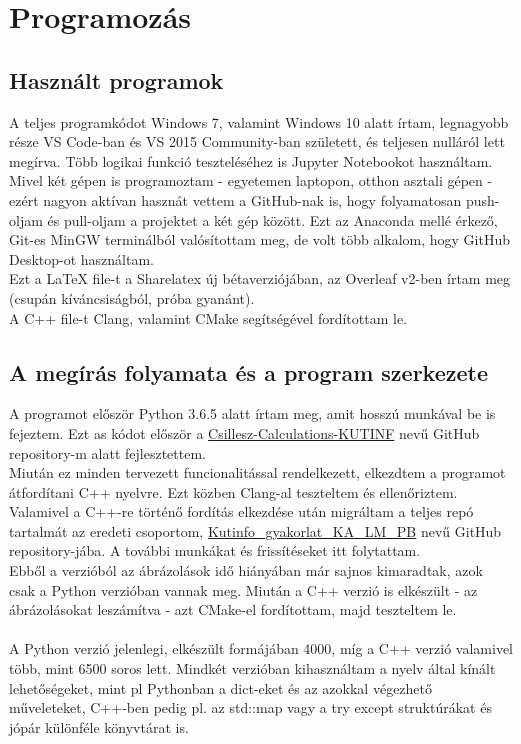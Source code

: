 \chapter{Programozás}

\label{ch:programozas}

\section{Használt programok}

A teljes programkódot Windows 7, valamint Windows 10 alatt írtam, legnagyobb része VS Code-ban és VS 2015 Community-ban született, és teljesen nulláról lett megírva. Több logikai funkció teszteléséhez is Jupyter Notebookot használtam. Mivel két gépen is programoztam - egyetemen laptopon, otthon asztali gépen - ezért nagyon aktívan hasznát vettem a GitHub-nak is, hogy folyamatosan push-oljam és pull-oljam a projektet a két gép között. Ezt az Anaconda mellé érkező, Git-es MinGW terminálból valósítottam meg, de volt több alkalom, hogy GitHub Desktop-ot használtam.\\
Ezt a LaTeX file-t a Sharelatex új bétaverziójában, az Overleaf v2-ben írtam meg (csupán kíváncsiságból, próba gyanánt).\\
A C++ file-t Clang, valamint CMake segítségével fordítottam le.

\section{A megírás folyamata és a program szerkezete}

A programot először Python 3.6.5 alatt írtam meg, amit hosszú munkával be is fejeztem. Ezt as kódot először a \href{https://github.com/masterdesky/Csillesz-Calculations-KUTINF}{Csillesz-Calculations-KUTINF} nevű GitHub repository-m alatt fejlesztettem.\\
Miután ez minden tervezett funcionalitással rendelkezett, elkezdtem a programot átfordítani C++ nyelvre. Ezt közben Clang-al teszteltem és ellenőriztem. \\ 
Valamivel a C++-re történő fordítás elkezdése után migráltam a teljes repó tartalmát az eredeti csoportom, \href{https://github.com/masterdesky/Kutinfo_gyakorlat_KA_LM_PB}{Kutinfo\_gyakorlat\_KA\_LM\_PB} nevű GitHub repository-jába. A további munkákat és frissítéseket itt folytattam.\\
Ebből a verzióból az ábrázolások idő hiányában már sajnos kimaradtak, azok csak a Python verzióban vannak meg. Miután a C++ verzió is elkészült - az ábrázolásokat leszámítva - azt CMake-el fordítottam, majd teszteltem le.\\ \\
A Python verzió jelenlegi, elkészült formájában 4000, míg a C++ verzió valamivel több, mint 6500 soros lett. Mindkét verzióban kihasználtam a nyelv által kínált lehetőségeket, mint pl Pythonban a dict-eket és az azokkal végezhető műveleteket, C++-ben pedig pl. az std::map vagy a try{} except{} struktúrákat és jópár különféle könyvtárat is.


